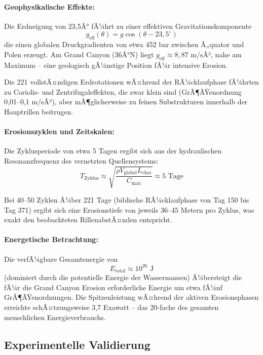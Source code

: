 ﻿\documentclass[12pt,a4paper]{report}
\begin{document}
\paragraph{Geophysikalische Effekte:}
Die Erdneigung von 23,5Â° fÃ¼hrt zu einer effektiven Gravitationskomponente
\begin{equation}
	g_{\text{eff}}(\theta) = g \cos(\theta - 23{,}5^\circ)
\end{equation}
die einen globalen Druckgradienten von etwa 452 bar zwischen Ã„quator und Polen erzeugt. Am Grand Canyon (36Â°N) liegt $g_{\text{eff}} \approx 8{,}87$ m/sÂ², nahe am Maximum -- eine geologisch gÃ¼nstige Position fÃ¼r intensive Erosion.

Die 221 vollstÃ¤ndigen Erdrotationen wÃ¤hrend der RÃ¼cklaufphase fÃ¼hrten zu Coriolis- und Zentrifugaleffekten, die zwar klein sind (GrÃ¶ÃŸenordnung 0,01--0,1 m/sÂ²), aber mÃ¶glich\-erweise zu feinen Substrukturen innerhalb der Hauptrillen beitrugen.

\paragraph{Erosionszyklen und Zeitskalen:}
Die Zyklusperiode von etwa 5 Tagen ergibt sich aus der hydraulischen Resonanzfrequenz des vernetzten Quellensystems:
\begin{equation}
	T_{\text{Zyklus}} \approx \sqrt{\frac{\rho V_{\text{global}} L_{\text{char}}}{C_{\text{max}}}} \approx 5 \text{ Tage}
\end{equation}

Bei 40--50 Zyklen Ã¼ber 221 Tage (biblische RÃ¼cklaufphase von Tag 150 bis Tag 371) ergibt sich eine Erosionstiefe von jeweils 36--45 Metern pro Zyklus, was exakt den beobachteten RillenabstÃ¤nden entspricht.

\paragraph{Energetische Betrachtung:}
Die verfÃ¼gbare Gesamtenergie von
\begin{equation}
	E_{\text{total}} \approx 10^{26} \text{ J}
\end{equation}
(dominiert durch die potentielle Energie der Wassermassen) Ã¼bersteigt die fÃ¼r die Grand Canyon Erosion erforderliche Energie um etwa fÃ¼nf GrÃ¶ÃŸenordnungen. Die Spitzenleistung wÃ¤hrend der aktiven Erosionsphasen erreichte schÃ¤tzungsweise 3,7 Exawatt -- das 20-fache des gesamten menschlichen Energieverbrauchs.

\subsection{Experimentelle Validierung}
\end{document}
